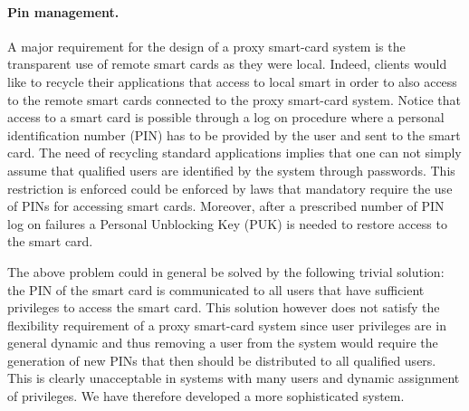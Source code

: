 \documentclass[runningheads]{llncs}
\begin{document}
\paragraph{Pin management.}
A major requirement for the design of a proxy smart-card system is the transparent use of remote smart cards as they were local. Indeed, clients would like to recycle their applications that access to local smart in order to also access to the remote smart cards connected to the proxy smart-card system. Notice that access to a smart card is possible through a log on procedure where a personal identification number (PIN) has to be provided by the user and sent to the smart card. The need of recycling standard applications implies that one can not simply assume that qualified users are identified by the system through passwords. This restriction is enforced could be enforced by laws that mandatory require the use of PINs for accessing smart cards. Moreover, after a prescribed number of PIN log on failures a Personal Unblocking Key (PUK) is needed to restore access to the smart card.

The above problem could in general be solved by the following trivial solution: the PIN of the smart card is communicated to all users that have sufficient privileges to access the smart card. This solution however does not satisfy the flexibility requirement of a proxy smart-card system since user privileges are in general dynamic and thus removing a user from the system would require the generation of new PINs that then should be distributed to all qualified users. This is clearly unacceptable in systems with many users and dynamic assignment of privileges. We have therefore developed a more sophisticated system.
\end{document}
